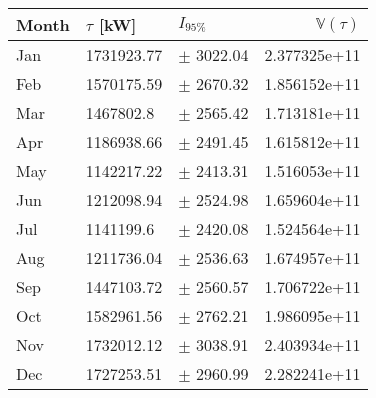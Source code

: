 \begin{tabular}{lllr}
\toprule
Month & $\tau$ [kW] &      $I_{95\%}$ &  $\mathbb{V}(\tau)$ \\
\midrule
  Jan &  1731923.77 &   $\pm$ 3022.04 &        2.377325e+11 \\
  Feb &  1570175.59 &   $\pm$ 2670.32 &        1.856152e+11 \\
  Mar &   1467802.8 &   $\pm$ 2565.42 &        1.713181e+11 \\
  Apr &  1186938.66 &   $\pm$ 2491.45 &        1.615812e+11 \\
  May &  1142217.22 &   $\pm$ 2413.31 &        1.516053e+11 \\
  Jun &  1212098.94 &   $\pm$ 2524.98 &        1.659604e+11 \\
  Jul &   1141199.6 &   $\pm$ 2420.08 &        1.524564e+11 \\
  Aug &  1211736.04 &   $\pm$ 2536.63 &        1.674957e+11 \\
  Sep &  1447103.72 &   $\pm$ 2560.57 &        1.706722e+11 \\
  Oct &  1582961.56 &   $\pm$ 2762.21 &        1.986095e+11 \\
  Nov &  1732012.12 &   $\pm$ 3038.91 &        2.403934e+11 \\
  Dec &  1727253.51 &   $\pm$ 2960.99 &        2.282241e+11 \\
\bottomrule
\end{tabular}
